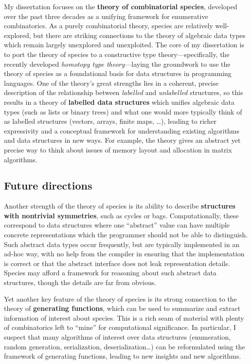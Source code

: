 \documentclass[12pt]{article}
\begin{document}
My dissertation focuses on the \textbf{theory of combinatorial
  species}, developed over the past three decades as a unifying
framework for enumerative combinatorics. As a purely combinatorial
theory, species are relatively well-explored, but there are striking
connections to the theory of algebraic data types which remain largely
unexplored and unexploited. The core of my dissertation is to port
the theory of species to a constructive type theory---specifically,
the recently developed \emph{homotopy type theory}---laying the
groundwork to use the theory of species as a foundational basis for
data structures in programming languages.  One of the theory's great
strengths lies in a coherent, precise description of the relationship
between \emph{labelled} and \emph{unlabelled} structures, so this
results in a theory of \textbf{labelled data structures} which unifies
algebraic data types (such as lists or binary trees) and what one
would more typically think of as labelled structures (vectors, arrays,
finite maps, \dots), leading to richer expressivity and a conceptual
framework for understanding existing algorithms and data structures in
new ways.  For example, the theory gives an abstract yet precise way
to think about issues of memory layout and allocation in matrix
algorithms.

\subsection*{Future directions}

Another strength of the theory of species is its ability to describe
\textbf{structures with nontrivial symmetries}, such as cycles or
bags.  Computationally, these correspond to data structures where one
``abstract'' value can have multiple concrete representations which
the programmer should not be able to distinguish.  Such abstract data
types occur frequently, but are typically implemented in an ad-hoc
way, with no help from the compiler in ensuring that the
implementation is correct or that the abstract interface does not leak
representation details.  Species may afford a framework for reasoning
about such abstract data structures, though the details are far from
obvious.

Yet another key feature of the theory of species is its strong
connection to the theory of \textbf{generating functions}, which can
be used to summarize and extract information of interest about
species.  This is a rich seam of material with plenty of combinatorics
left to ``mine'' for computational significance.  In particular, I
suspect that many algorithms of interest over data structures
(enumeration, random generation, serialization, deserialization\dots)
can be reformulated using the framework of generating functions,
leading to new insights and new algorithms.



\end{document}
